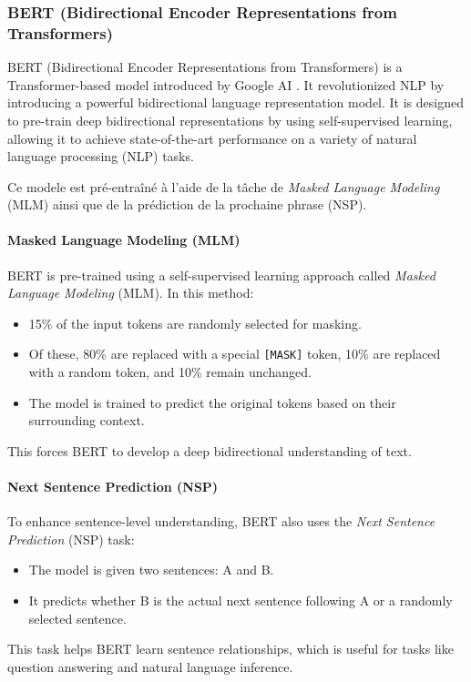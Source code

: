 \documentclass{article}
\begin{document}
\subsubsection{BERT (Bidirectional Encoder Representations from Transformers)}
BERT (Bidirectional Encoder Representations from Transformers) is a Transformer-based model introduced by Google AI \cite{devlin2018bert}. It revolutionized NLP by introducing a powerful bidirectional language representation model. It is designed to pre-train deep bidirectional representations by using self-supervised learning, allowing it to achieve state-of-the-art performance on a variety of natural language processing (NLP) tasks.

Ce modele est pré-entraîné à l'aide de la tâche de \textit{Masked Language Modeling} (MLM) ainsi que de la prédiction de la prochaine phrase (NSP).

\paragraph{Masked Language Modeling (MLM)} BERT is pre-trained using a self-supervised learning approach called \textit{Masked Language Modeling} (MLM). In this method:
\begin{itemize}
    \item 15\% of the input tokens are randomly selected for masking.
    \item Of these, 80\% are replaced with a special \texttt{[MASK]} token, 10\% are replaced with a random token, and 10\% remain unchanged.
    \item The model is trained to predict the original tokens based on their surrounding context.
\end{itemize}
This forces BERT to develop a deep bidirectional understanding of text.

\paragraph{Next Sentence Prediction (NSP)} To enhance sentence-level understanding, BERT also uses the \textit{Next Sentence Prediction} (NSP) task:
\begin{itemize}
    \item The model is given two sentences: A and B.
    \item It predicts whether B is the actual next sentence following A or a randomly selected sentence.
\end{itemize}
This task helps BERT learn sentence relationships, which is useful for tasks like question answering and natural language inference.
\end{document}
